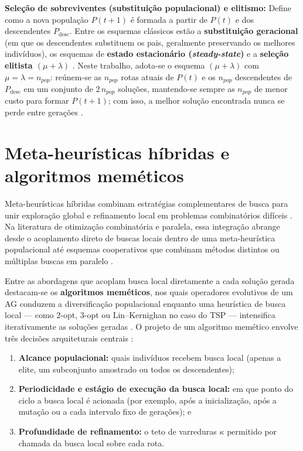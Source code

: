\begin{itemize}
            \textbf{Seleção de sobreviventes (substituição populacional) e elitismo:} Define como a nova população \(P(t+1)\) é formada a partir de \(P(t)\) e dos descendentes \(P_{\mathrm{desc}}\).
            Entre os esquemas clássicos estão a \textbf{substituição geracional} (em que os descendentes substituem os pais, geralmente preservando os melhores indivíduos), os esquemas de \textbf{estado estacionário (\emph{steady-state})} e a \textbf{seleção elitista \((\mu + \lambda)\)} \autocite{eiben2015introduction}. Neste trabalho, adota-se o esquema \((\mu + \lambda)\) com \(\mu = \lambda = n_{pop}\): reúnem-se as \(n_{pop}\) rotas atuais de \(P(t)\) e os \(n_{pop}\) descendentes de \(P_{\mathrm{desc}}\) em um conjunto de \(2\,n_{pop}\) soluções, mantendo-se sempre as \(n_{pop}\) de menor custo para formar \(P(t+1)\); com isso, a melhor solução encontrada nunca se perde entre gerações \autocite{goldberg1989genetic,eiben2015introduction}.
\end{itemize}

\section{Meta-heurísticas híbridas e algoritmos meméticos}\label{sec-24-metaheuristicas-hibridas}

Meta-heurísticas híbridas combinam estratégias complementares de busca para unir exploração global e refinamento local em problemas combinatórios difíceis \autocite{voudouris1999tsp}.
Na literatura de otimização combinatória e paralela, essa integração abrange desde o acoplamento direto de buscas locais dentro de uma meta-heurística populacional até esquemas cooperativos que combinam métodos distintos ou múltiplas buscas em paralelo \autocite{larranaga1999genetic,crainic2003parallel,alba2005parallel}.

Entre as abordagens que acoplam busca local diretamente a cada solução gerada destacam-se os \textbf{algoritmos meméticos}, nos quais operadores evolutivos de um AG conduzem a diversificação populacional enquanto uma heurística de busca local --- como \(2\)-opt, \(3\)-opt ou Lin--Kernighan no caso do TSP --- intensifica iterativamente as soluções geradas \autocite{larranaga1999genetic}.
O projeto de um algoritmo memético envolve três decisões arquiteturais centrais \autocite{larranaga1999genetic}:

\begin{enumerate}[label=(\roman*)]
      \item
            \textbf{Alcance populacional:} quais indivíduos recebem busca local (apenas a elite, um subconjunto amostrado ou todos os descendentes);
      \item
            \textbf{Periodicidade e estágio de execução da busca local:} em que ponto do ciclo a busca local é acionada (por exemplo, após a inicialização, após a mutação ou a cada intervalo fixo de gerações); e
      \item
            \textbf{Profundidade de refinamento:} o teto de varreduras \(\kappa\) permitido por chamada da busca local sobre cada rota.
\end{enumerate}

